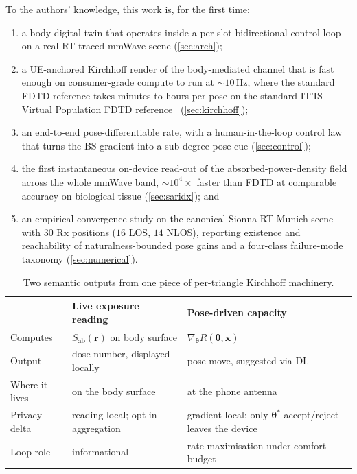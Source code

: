 \documentclass[journal,twocolumn,10pt]{IEEEtran}
\theoremstyle{plain}
\theoremstyle{definition}
\theoremstyle{remark}
\newcommand{\rr}{\mathbf{r}}
\newcommand{\xx}{\mathbf{x}}
\newcommand{\Sab}{S_{\mathrm{ab}}}
\newcommand{\thetab}{\bm{\theta}}
\begin{document}
To the authors' knowledge, this work is, for the first time:
\begin{enumerate}
\item a body digital twin that operates inside a per-slot
bidirectional control loop on a real RT-traced mmWave scene
(\cref{sec:arch});
\item a UE-anchored Kirchhoff render of the body-mediated channel
that is fast enough on consumer-grade compute to run at
$\sim\!10\,$Hz, where the standard FDTD reference takes
minutes-to-hours per pose on the standard IT'IS Virtual
Population FDTD reference~\cite{Christ2010VF} (\cref{sec:kirchhoff});
\item an end-to-end pose-differentiable rate, with a
human-in-the-loop control law that turns the BS gradient into a
sub-degree pose cue (\cref{sec:control});
\item the first instantaneous on-device read-out of the
absorbed-power-density field across the whole mmWave band,
$\sim\!10^{4}\times$ faster than FDTD at comparable accuracy on
biological tissue (\cref{sec:saridx}); and
\item an empirical convergence study on the canonical Sionna RT
Munich scene with $30$ Rx positions ($16$ LOS, $14$ NLOS),
reporting existence and reachability of naturalness-bounded pose
gains and a four-class failure-mode taxonomy
(\cref{sec:numerical}).
\end{enumerate}

\begin{table}[!t]
\caption{Two semantic outputs from one piece of per-triangle
Kirchhoff machinery.}
\label{tab:two-products}
\centering\small
\begin{tabular}{@{}p{}p{}p{}@{}}
\toprule
& \textbf{Live exposure reading} & \textbf{Pose-driven capacity} \\
\midrule
Computes & $\Sab(\rr)$ on body surface & $\nabla_{\thetab} R(\thetab,\xx)$ \\
Output & dose number, displayed locally & pose move, suggested via DL \\
Where it lives & on the body surface & at the phone antenna \\
Privacy delta & reading local; opt-in aggregation & gradient local; only $\thetab^{*}$ accept/reject leaves the device \\
Loop role & informational & rate maximisation under comfort budget \\
\bottomrule
\end{tabular}
\end{table}
\end{document}
